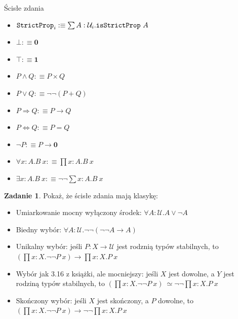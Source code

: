 \documentclass[11pt]{article}
\theoremstyle{definition}
\newtheorem{exercise}{Zadanie}[section]
\newcommand{\txt}[1]{\texttt{#1}}
\renewcommand{\(}{\left(}
\renewcommand{\)}{\right)}
\newcommand{\defn}{:\equiv}
\newcommand{\U}{\mathcal{U}}
\newcommand{\apl}[2]{#1\ #2}
\newcommand{\hequiv}[2]{#1 \simeq #2}
\newcommand{\Empty}{\mathbf{0}}
\newcommand{\Unit}{\mathbf{1}}
\newcommand{\dprod}[2]{\prod #1.#2}
\newcommand{\dsum}[2]{\sum #1.#2}
\newcommand{\prodt}[2]{#1 \times #2}
\newcommand{\sumt}[2]{#1 + #2}
\newcommand{\all}[2]{\forall #1.#2}
\newcommand{\ex}[2]{\exists #1.#2}
\begin{document}
\newcommand{\StrictProp}{\txt{StrictProp}}

\begin{center}
  Ścisłe zdania

  \begin{itemize}
    \item $\StrictProp_i \defn \dsum{A : \U_i}{\apl{\isStrictProp}{A}}$
    \item $\bot \defn \Empty$
    \item $\top \defn \Unit$
    \item $P \land Q \defn \prodt{P}{Q}$
    \item $P \lor Q \defn \neg \neg (\sumt{P}{Q})$
    \item $P \Rightarrow Q \defn P \to Q$
    \item $P \Leftrightarrow Q \defn P = Q$
    \item $\neg P \defn P \to \Empty$
    \item $\all{x : A}{\apl{B}{x}} \defn \dprod{x : A}{\apl{B}{x}}$
    \item $\ex{x : A}{\apl{B}{x}} \defn \neg \neg \dsum{x : A}{\apl{B}{x}}$
  \end{itemize}
\end{center}

\begin{exercise}
  Pokaż, że ścisłe zdania mają klasykę:

  \begin{itemize}
    \item Umiarkowanie mocny wyłączony środek: $\all{A : \U}{A \lor \neg A}$
    \item Biedny wybór: $\all{A : \U}{\neg \neg (\neg \neg A \to A)}$
    \item Unikalny wybór: jeśli $P : X \to \U$ jest rodznią typów stabilnych, to $(\dprod{x : X}{\neg \neg \apl{P}{x}}) \to \dprod{x : X}{\apl{P}{x}}$
    \item Wybór jak 3.16 z książki, ale mocniejszy: jeśli $X$ jest dowolne, a $Y$ jest rodziną typów stabilnych, to $(\dprod{x : X}{\neg \neg \apl{P}{x}}) \hequiv\ \neg \neg \dprod{x : X}{\apl{P}{x}}$
    \item Skończony wybór: jeśli $X$ jest skończony, a $P$ dowolne, to \\ $(\dprod{x : X}{\neg \neg \apl{P}{x}}) \to \neg \neg \dprod{x : X}{\apl{P}{x}}$
  \end{itemize}
\end{exercise}

\newcommand{\acs}{\txt{acs}}
\end{document}
